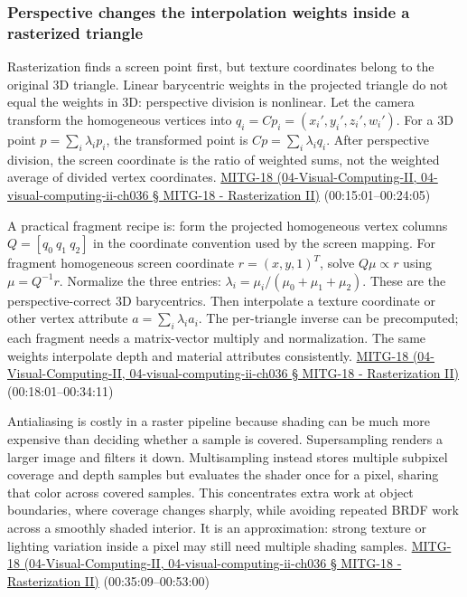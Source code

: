 \subsubsection{Perspective changes the interpolation weights inside a rasterized triangle}\label{perspective-changes-the-interpolation-weights-inside-a-rasterized-triangle}

Rasterization finds a screen point first, but texture coordinates belong to the original 3D triangle. Linear barycentric weights in the projected triangle do not equal the weights in 3D: perspective division is nonlinear. Let the camera transform the homogeneous vertices into \(q_i=Cp_i=(x_i',y_i',z_i',w_i')\). For a 3D point \(p=\sum_i\lambda_i p_i\), the transformed point is \(Cp=\sum_i\lambda_i q_i\). After perspective division, the screen coordinate is the ratio of weighted sums, not the weighted average of divided vertex coordinates. \href{}{MITG-18 (04-Visual-Computing-II, 04-visual-computing-ii-ch036 § MITG-18 - Rasterization II)} (00:15:01--00:24:05)

A practical fragment recipe is: form the projected homogeneous vertex columns \(Q=[q_0\ q_1\ q_2]\) in the coordinate convention used by the screen mapping. For fragment homogeneous screen coordinate \(r=(x,y,1)^T\), solve \(Q\mu\propto r\) using \(\mu=Q^{-1}r\). Normalize the three entries: \(\lambda_i=\mu_i/(\mu_0+\mu_1+\mu_2)\). These are the perspective-correct 3D barycentrics. Then interpolate a texture coordinate or other vertex attribute \(a=\sum_i\lambda_i a_i\). The per-triangle inverse can be precomputed; each fragment needs a matrix-vector multiply and normalization. The same weights interpolate depth and material attributes consistently. \href{}{MITG-18 (04-Visual-Computing-II, 04-visual-computing-ii-ch036 § MITG-18 - Rasterization II)} (00:18:01--00:34:11)

Antialiasing is costly in a raster pipeline because shading can be much more expensive than deciding whether a sample is covered. Supersampling renders a larger image and filters it down. Multisampling instead stores multiple subpixel coverage and depth samples but evaluates the shader once for a pixel, sharing that color across covered samples. This concentrates extra work at object boundaries, where coverage changes sharply, while avoiding repeated BRDF work across a smoothly shaded interior. It is an approximation: strong texture or lighting variation inside a pixel may still need multiple shading samples. \href{}{MITG-18 (04-Visual-Computing-II, 04-visual-computing-ii-ch036 § MITG-18 - Rasterization II)} (00:35:09--00:53:00)

